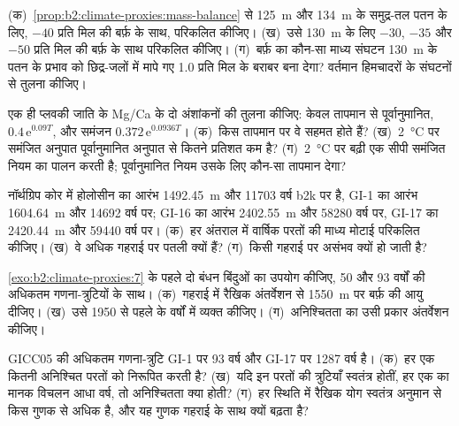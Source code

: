 \begin{exercise}[$\star\star$]\label{exo:b2:climate-proxies:5}
(क)~\cref{prop:b2:climate-proxies:mass-balance} से \qty{125}{m} और \qty{134}{m} के समुद्र-तल
पतन के लिए, $-40$ प्रति मिल की बर्फ़ के साथ,  परिकलित कीजिए। (ख)~उसे
\qty{130}{m} के लिए $-30$, $-35$ और $-50$ प्रति मिल की बर्फ़ के साथ परिकलित कीजिए। (ग)~बर्फ़ का कौन-सा माध्य संघटन
\qty{130}{m} के पतन के प्रभाव को छिद्र-जलों में मापे गए \num{1.0} प्रति मिल के बराबर
बना देगा? वर्तमान हिमचादरों के संघटनों से तुलना कीजिए।
\end{exercise}

\begin{exercise}[$\star\star$]\label{exo:b2:climate-proxies:6}
एक ही प्लवकी जाति के Mg/Ca के दो अंशांकनों की तुलना कीजिए: केवल
तापमान से पूर्वानुमानित, $0.4\,\mathrm{e}^{0.09T}$, और समंजन $0.372\,\mathrm{e}^{0.0936T}$। (क)~किस
तापमान पर वे सहमत होते हैं? (ख)~\qty{2}{\celsius} पर समंजित अनुपात पूर्वानुमानित अनुपात से कितने प्रतिशत
कम है? (ग)~\qty{2}{\celsius} पर बढ़ी एक सीपी समंजित नियम का पालन करती है; पूर्वानुमानित नियम उसके लिए कौन-सा
तापमान देगा?
\end{exercise}

\begin{exercise}[$\star\star$]\label{exo:b2:climate-proxies:7}
नॉर्थग्रिप कोर में होलोसीन का आरंभ \qty{1492.45}{m} और \num{11703} वर्ष
b2k पर है, GI-1 का आरंभ \qty{1604.64}{m} और \num{14692} वर्ष पर; GI-16 का आरंभ
\qty{2402.55}{m} और \num{58280} वर्ष पर, GI-17 का \qty{2420.44}{m} और \num{59440} वर्ष पर।
(क)~हर अंतराल में वार्षिक परतों की माध्य मोटाई परिकलित कीजिए। (ख)~वे अधिक गहराई पर पतली
क्यों हैं? (ग)~किसी गहराई पर  असंभव क्यों हो जाती है?
\end{exercise}

\begin{exercise}[$\star\star$]\label{exo:b2:climate-proxies:8}
\cref{exo:b2:climate-proxies:7} के पहले दो बंधन बिंदुओं का उपयोग कीजिए, 50
और 93 वर्षों की अधिकतम गणना-त्रुटियों के साथ। (क)~गहराई में रैखिक अंतर्वेशन से \qty{1550}{m} पर बर्फ़ की आयु दीजिए।
(ख)~उसे 1950 से पहले के वर्षों में व्यक्त कीजिए। (ग)~अनिश्चितता का उसी प्रकार अंतर्वेशन कीजिए।
\end{exercise}

\begin{exercise}[$\star\star$]\label{exo:b2:climate-proxies:9}
GICC05 की अधिकतम गणना-त्रुटि GI-1 पर 93 वर्ष और GI-17 पर \num{1287} वर्ष है। (क)~हर एक कितनी
अनिश्चित परतों को निरूपित करती है? (ख)~यदि इन परतों की त्रुटियाँ स्वतंत्र होतीं, हर एक का मानक विचलन
आधा वर्ष, तो अनिश्चितता क्या होती? (ग)~हर स्थिति में रैखिक योग स्वतंत्र अनुमान से किस गुणक से
अधिक है, और यह गुणक गहराई के साथ क्यों बढ़ता है?
\end{exercise}

